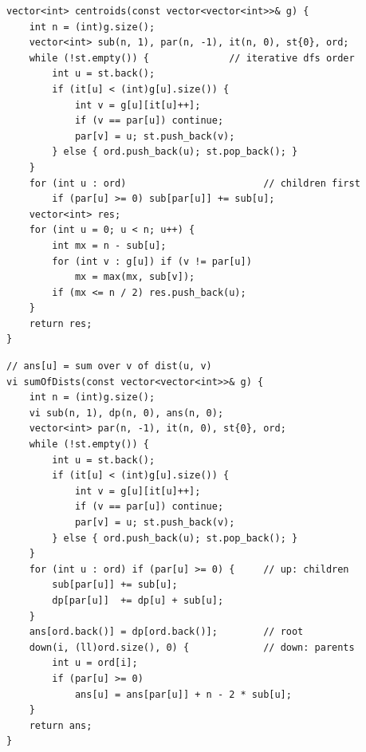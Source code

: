 
\begin{lstlisting}
vector<int> centroids(const vector<vector<int>>& g) {
    int n = (int)g.size();
    vector<int> sub(n, 1), par(n, -1), it(n, 0), st{0}, ord;
    while (!st.empty()) {              // iterative dfs order
        int u = st.back();
        if (it[u] < (int)g[u].size()) {
            int v = g[u][it[u]++];
            if (v == par[u]) continue;
            par[v] = u; st.push_back(v);
        } else { ord.push_back(u); st.pop_back(); }
    }
    for (int u : ord)                        // children first
        if (par[u] >= 0) sub[par[u]] += sub[u];
    vector<int> res;
    for (int u = 0; u < n; u++) {
        int mx = n - sub[u];
        for (int v : g[u]) if (v != par[u])
            mx = max(mx, sub[v]);
        if (mx <= n / 2) res.push_back(u);
    }
    return res;
}
\end{lstlisting}


\begin{lstlisting}
// ans[u] = sum over v of dist(u, v)
vi sumOfDists(const vector<vector<int>>& g) {
    int n = (int)g.size();
    vi sub(n, 1), dp(n, 0), ans(n, 0);
    vector<int> par(n, -1), it(n, 0), st{0}, ord;
    while (!st.empty()) {
        int u = st.back();
        if (it[u] < (int)g[u].size()) {
            int v = g[u][it[u]++];
            if (v == par[u]) continue;
            par[v] = u; st.push_back(v);
        } else { ord.push_back(u); st.pop_back(); }
    }
    for (int u : ord) if (par[u] >= 0) {     // up: children
        sub[par[u]] += sub[u];
        dp[par[u]]  += dp[u] + sub[u];
    }
    ans[ord.back()] = dp[ord.back()];        // root
    down(i, (ll)ord.size(), 0) {             // down: parents
        int u = ord[i];
        if (par[u] >= 0)
            ans[u] = ans[par[u]] + n - 2 * sub[u];
    }
    return ans;
}
\end{lstlisting}

